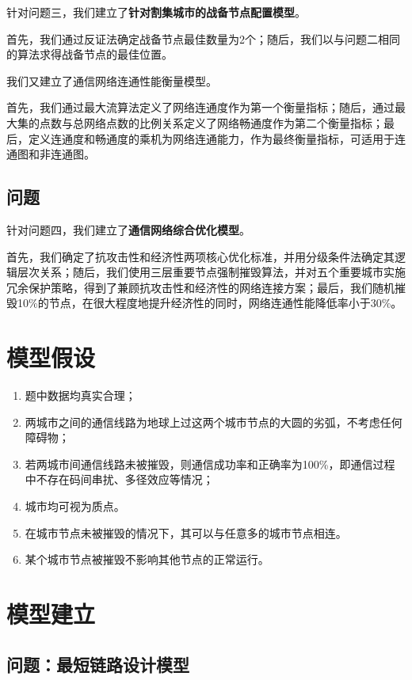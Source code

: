 \documentclass{article}
\begin{document}
针对问题三，我们建立了\textbf{针对割集城市的战备节点配置模型}。

首先，我们通过反证法确定战备节点最佳数量为2个；随后，我们以与问题二相同的算法求得战备节点的最佳位置。

我们又建立了通信网络连通性能衡量模型。

首先，我们通过最大流算法定义了网络连通度作为第一个衡量指标；随后，通过最大集的点数与总网络点数的比例关系定义了网络畅通度作为第二个衡量指标；最后，定义连通度和畅通度的乘机为网络连通能力，作为最终衡量指标，可适用于连通图和非连通图。

\subsection{问题}
\label{sub:问题\chinese{subsection}}

针对问题四，我们建立了\textbf{通信网络综合优化模型}。

首先，我们确定了抗攻击性和经济性两项核心优化标准，并用分级条件法确定其逻辑层次关系；随后，我们使用三层重要节点强制摧毁算法，并对五个重要城市实施冗余保护策略，得到了兼顾抗攻击性和经济性的网络连接方案；最后，我们随机摧毁10\%的节点，在很大程度地提升经济性的同时，网络连通性能降低率小于30\%。

\section{模型假设}%
\label{sub:模型假设}

\begin{enumerate}
	\item 题中数据均真实合理；
	\item 两城市之间的通信线路为地球上过这两个城市节点的大圆的劣弧，不考虑任何障碍物；
	\item 若两城市间通信线路未被摧毁，则通信成功率和正确率为100\%，即通信过程中不存在码间串扰、多径效应等情况；
	\item 城市均可视为质点。
	\item 在城市节点未被摧毁的情况下，其可以与任意多的城市节点相连。
	\item 某个城市节点被摧毁不影响其他节点的正常运行。
\end{enumerate}

\section{模型建立}%
\label{sec:模型建立}

\subsection{问题：最短链路设计模型}
\label{sub:问题\chinese{subsection}：最短链路设计模型}
\end{document}
